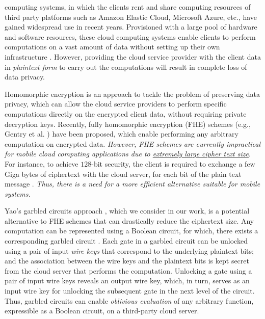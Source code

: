 \documentclass[10pt,journal,cspaper,compsoc]{IEEEtran}
\begin{document}
 computing systems, in which the clients rent and share computing resources of third party platforms such as Amazon Elastic Cloud, Microsoft Azure, etc., have gained widespread use in recent years. Provisioned with a large pool of hardware and software resources, these cloud computing systems enable clients to perform computations on a vast amount of data without setting up their own infrastructure \cite{armbrust10}. However, providing the cloud service provider with the client data in {\em plaintext form} to carry out the computations will result in complete loss of data privacy.


Homomorphic encryption \cite{rivest78} is an approach to tackle the problem of preserving data privacy, which can allow the cloud service providers to perform specific computations directly on the encrypted client data, without requiring private decryption keys. Recently, fully homomorphic encryption (FHE) schemes (e.g., Gentry et al. \cite{gentry10}) have been proposed, which enable performing any arbitrary computation on encrypted data. {\em However, FHE schemes are currently impractical for mobile cloud computing applications due to \underline{extremely large cipher text size}}. For instance, to achieve $128$-bit security, the client is required to exchange a few Giga bytes of ciphertext with the cloud server, for each bit of the plain text message \cite{gentry10}. {\em Thus, there is a need for a more efficient alternative suitable for mobile systems.}


Yao's garbled circuits approach \cite{yao82,yao86}, which we consider in our work, is a potential alternative to FHE schemes that can drastically reduce the ciphertext size. Any computation can be represented using a Boolean circuit, for which, there exists a corresponding garbled circuit \cite{yao82,yao86,goldreich04,goldreich87}. Each gate in a garbled circuit can be unlocked using a pair of input {\em wire keys} that correspond to the underlying plaintext bits; and the association between the wire keys and the plaintext bits is kept secret from the cloud server that performs the computation. Unlocking a gate using a pair of input wire keys reveals an output wire key, which, in turn, serves as an input wire key for unlocking the subsequent gate in the next level of the circuit. Thus, garbled circuits can enable {\em oblivious evaluation} of any arbitrary function, expressible as a Boolean circuit, on a third-party cloud server.
\end{document}
